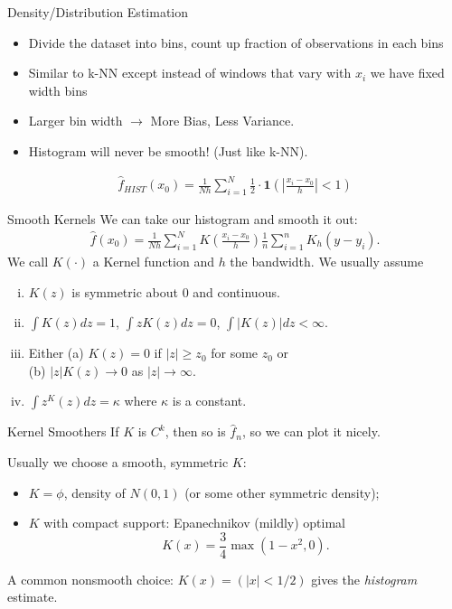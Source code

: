 \begin{frame}{Density/Distribution Estimation}
\begin{itemize}
\item Divide the dataset into bins, count up fraction of observations in each bins
\item Similar to k-NN except instead of windows that vary with $x_i$ we have fixed width bins
\item Larger bin width $\rightarrow$ More Bias, Less Variance.
\item Histogram will never be smooth! (Just like k-NN).
\end{itemize}
\begin{eqnarray*}
\hat{f}_{HIST}(x_0) = \frac{1}{Nh} \sum_{i=1}^N  \frac{1}{2} \cdot \mathbf{1} \left (\left|\frac{x_i - x_0}{h} \right| < 1 \right)
\end{eqnarray*}
\end{frame}




\begin{frame}{Smooth Kernels}
We can take our histogram and smooth it out:
\begin{eqnarray*}
\hat{f}(x_0) = \frac{1}{Nh} \sum_{i=1}^N  K  \left(\frac{x_i - x_0}{h} \right)  \frac{1}{n}\sum_{i=1}^n K_h\left(
y-y_i\right).
\end{eqnarray*}
We call $K(\cdot)$ a \alert{Kernel function} and $h$ the \alert{bandwidth}. We usually assume
\begin{enumerate}[(i)]
\item $K(z)$ is symmetric about $0$ and continuous.
\item $\int K(z) d z = 1$,  $\int z K(z) d z = 0$,  $\int |K(z)| d z < \infty$.
\item Either (a) $K(z) = 0$ if $|z| \geq z_0$ for some $z_0$ or \\
(b) $|z| K(z) \rightarrow 0$ as $|z| \rightarrow \infty$.
\item $\int z^ K(z) d z = \kappa$ where $\kappa$ is a constant.
\end{enumerate}
\end{frame}

\begin{frame}{Kernel Smoothers}
If $K$ is $C^k$, then so is ${\hat f}_n$, so we can plot it nicely.

\pause

Usually we choose a smooth, symmetric $K$:



\pause




\begin{itemize}[<+->]
\item $K=\phi$, density of $N(0,1)$ (or some other symmetric density);
\item $K$ with compact support: Epanechnikov (mildly) optimal
\[
K(x)= \frac{3}{4} \max(1-x^2,0).
\]
\end{itemize}
\pause
A common nonsmooth choice: $K(x)=(|x|<1/2)$ gives the {\em histogram}
estimate.
\end{frame}


